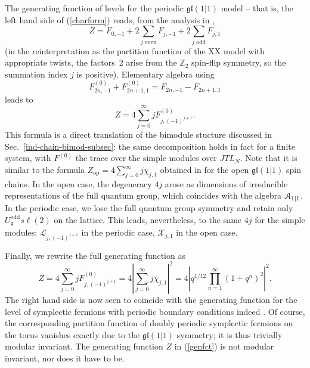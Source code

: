 \documentclass[11pt]{article}
\newcommand{\q}{\mathfrak{q}}
\newcommand{\JTL}[1]{JTL_{#1}}
\newcommand{\LQGodd}{U^{\text{odd}}_{\q} s\ell(2)}
\newcommand{\oZ}{\mathbb{Z}}
\newcommand{\gl}{\mathfrak{gl}}
\newcommand{\VX}{\mathcal{X}}
\newcommand{\AIrrTL}[2]{\mathscr{L}_{#1,#2}}
\theoremstyle{definition}
\begin{document}
The generating
function of levels for the periodic $\gl(1|1)$ model -- that is, the left hand
side of (\ref{charform}) reads, from the analysis in
\cite{ReadSaleur01},
%
\begin{equation}\label{genfct}
Z=F_{0,-1}+2\sum_{ j\text{ even}} F_{j,-1}+2\sum_{j \text{ odd}} F_{j,1}
\end{equation}
%
(in the reinterpretation as the partition function of the XX model
with appropriate twists, the factors~$2$ arise from the $\oZ_2$
spin-flip symmetry, so the summation index  $j$ is positive).  Elementary algebra using
%
\begin{equation}
F_{2n,-1}^{(0)}+F_{2n+1,1}^{(0)}=F_{2n,-1}-F_{2n+1,1}
\end{equation}
%
leads to
%
\begin{equation}
Z=4\sum_{j=0}^\infty jF_{j,(-1)^{j+1}}^{(0)}.
\end{equation}
%
This formula is a direct translation of the bimodule stucture
discussed in Sec.~\ref{ind-chain-bimod-subsec}: the same
decomposition holds in fact for a finite system, with $F^{(0)}$ the trace
over the simple modules over $\JTL{N}$.
Note that it is similar to the formula $Z_{\mathrm{op}}=4\sum_{j=0}^\infty j\chi_{j,1}$
 obtained in \cite{ReadSaleur07-2} for the open $\gl(1|1)$ spin chains.
 In the open case, the degeneracy $4j$ arose as dimensions of irreducible representations of the full quantum group, which coincides with the algebra ${\cal A}_{1|1}$. In the periodic case, we lose the full quantum group symmetry and retain only $\LQGodd$ on the lattice. This leads, nevertheless, to the same $4j$ for the
simple modules: $\AIrrTL{j}{(-1)^{j+1}} $ in the periodic case, $\VX_{j,1}$ in the open case.

Finally, we rewrite the full generating function as
%
\begin{equation}
Z=4\sum_{j=0}^\infty jF_{j,(-1)^{j+1}}^{(0)}=4\left|\sum_{j=0}^\infty j\chi_{j,1}\right|^2=4\left| q^{1/12}\prod_{n=1}^\infty (1+q^n)^2\right|^2.
\end{equation}
%
The right hand side is now seen to coincide with the generating
function for the level of symplectic fermions with periodic boundary
conditions indeed \cite{Kausch}. Of course, the corresponding
partition function of doubly periodic symplectic fermions on the torus
vanishes exactly due to the $\gl(1|1)$ symmetry; it is thus trivially
modular invariant. The generating function $Z$ in (\ref{genfct}) is not modular invariant, nor does it have to be.
\end{document}
